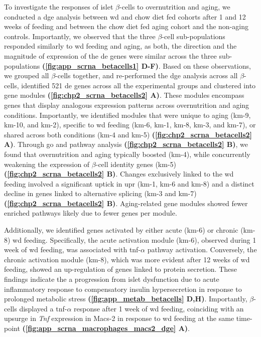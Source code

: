 \par To investigate the responses of islet $\beta$-cells to overnutrition and aging, we conducted a \gls{dge} analysis between \gls{wd} and chow diet fed cohorts after 1 and 12 weeks of feeding and between the chow diet fed aging cohort and the non-aging controls. Importantly, we observed that the three $\beta$-cell sub-populations responded similarly to \gls{wd} feeding and aging, as both, the direction and the magnitude of expression of the \gls{de} genes were similar across the three sub-populations \textbf{(\autoref{fig:app_scrna_betacells1} D-F)}. Based on these observations, we grouped all $\beta$-cells together, and re-performed the \gls{dge} analysis across all $\beta$-cells, identified 521 \gls{de} genes across all the experimental groups and clustered into gene modules \textbf{(\autoref{fig:chp2_scrna_betacells2} A)}. These modules encompass genes that display analogous expression patterns across overnutrition and aging conditions. Importantly, we identified modules that were unique to aging (km-9, km-10, and km-2), specific to \gls{wd} feeding (km-6, km-1, km-8, km-3, and km-7), or shared across both conditions (km-4 and km-5) \textbf{(\autoref{fig:chp2_scrna_betacells2} A)}. Through \gls{go} and pathway analysis \textbf{(\autoref{fig:chp2_scrna_betacells2} B)}, we found that overnutrition and aging typically boosted  (km-4), while concurrently weakening the expression of $\beta$-cell identity genes (km-5) \textbf{(\autoref{fig:chp2_scrna_betacells2} B)}. Changes exclusively linked to the \gls{wd} feeding involved a significant uptick in \gls{upr} (km-1, km-6 and km-8) and a distinct decline in genes linked to alternative splicing (km-3 and km-7) \textbf{(\autoref{fig:chp2_scrna_betacells2} B)}. Aging-related gene modules showed fewer enriched pathways likely due to fewer genes per module.\\ %
\par Additionally, we identified genes activated by either acute (km-6) or chronic (km-8) \gls{wd} feeding. Specifically, the acute activation module (km-6), observed during 1 week of \gls{wd} feeding, was associated with \gls{tnf}-$\alpha$ pathway activation. Conversely, the chronic activation module (km-8), which was more evident after 12 weeks of \gls{wd} feeding, showed an up-regulation of genes linked to protein secretion. These findings indicate the a progression from islet dysfunction due to acute inflammatory response to compensatory insulin hypersecretion in response to prolonged metabolic stress  \textbf{(\autoref{fig:app_metab_betacells} D,H)}. Importantly, $\beta$-cells displayed a \gls{tnf}-$\alpha$ response after 1 week of \gls{wd} feeding, coinciding with an upsurge in \textit{Tnf} expression in Macs-2 in response to \gls{wd} feeding at the same time-point \textbf{(\autoref{fig:app_scrna_macrophages_macs2_dge} A)}.\\

